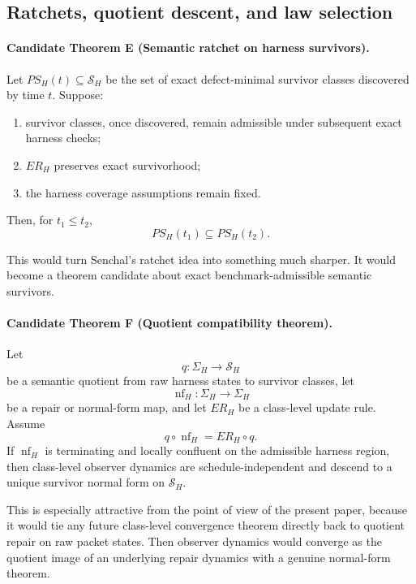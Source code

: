 \documentclass[11pt]{article}
\theoremstyle{remark}
\theoremstyle{plain}
\begin{document}
\subsection{Ratchets, quotient descent, and law selection}

\paragraph{Candidate Theorem E (Semantic ratchet on harness survivors).}
Let \(PS_H(t)\subseteq \mathcal S_H\) be the set of exact defect-minimal survivor classes discovered by time \(t\). Suppose:
\begin{enumerate}[leftmargin=2em]
\item survivor classes, once discovered, remain admissible under subsequent exact harness checks;
\item \(ER_H\) preserves exact survivorhood;
\item the harness coverage assumptions remain fixed.
\end{enumerate}
Then, for \(t_1\le t_2\),
\[
PS_H(t_1)\subseteq PS_H(t_2).
\]

This would turn Senchal's ratchet idea into something much sharper. It would become a theorem candidate about exact benchmark-admissible semantic survivors.

\paragraph{Candidate Theorem F (Quotient compatibility theorem).}
Let
\[
q:\Sigma_H\to \mathcal S_H
\]
be a semantic quotient from raw harness states to survivor classes, let
\[
\operatorname{nf}_H:\Sigma_H\to\Sigma_H
\]
be a repair or normal-form map, and let \(ER_H\) be a class-level update rule. Assume
\[
q\circ \operatorname{nf}_H = ER_H\circ q.
\]
If \(\operatorname{nf}_H\) is terminating and locally confluent on the admissible harness region, then class-level observer dynamics are schedule-independent and descend to a unique survivor normal form on \(\mathcal S_H\).

This is especially attractive from the point of view of the present paper, because it would tie any future class-level convergence theorem directly back to quotient repair on raw packet states. Then observer dynamics would converge as the quotient image of an underlying repair dynamics with a genuine normal-form theorem.
\end{document}
